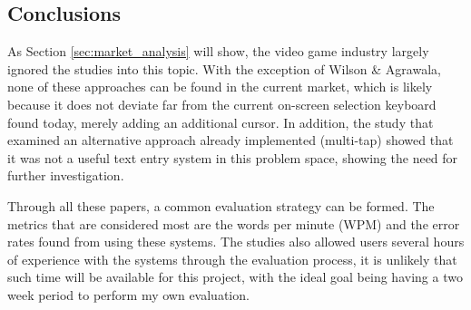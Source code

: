 \documentclass[requirements.tex]{subfiles}
\begin{document}
\subsection{Conclusions} %
\label{sub:conclusions}
As Section \ref{sec:market_analysis} will show, the video game industry largely
ignored the studies into this topic. With the exception of Wilson \& Agrawala,
none of these approaches can be found in the current market, which is likely
because it does not deviate far from the current on-screen selection keyboard
found today, merely adding an additional cursor. In addition, the study that
examined an alternative approach already implemented (multi-tap) showed that it
was not a useful text entry system in this problem space, showing the need for
further investigation.

Through all these papers, a common evaluation strategy can be formed. The
metrics that are considered most are the words per minute (WPM) and the error
rates found from using these systems. The studies also allowed users several
hours of experience with the systems through the evaluation process, it is
unlikely that such time will be available for this project, with the ideal goal
being having a two week period to perform my own evaluation.
\newpage
\end{document}
